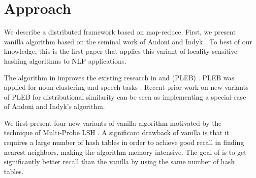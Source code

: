 \section{Approach}
\label{sec:approach}
We describe a distributed \lshf framework based on map-reduce. 
First, we present vanilla \lsh algorithm based on the seminal work of Andoni and Indyk  . 
To best of our knowledge, this is the first paper that applies this variant of locality sensitive hashing algorithms to NLP applications. 

The algorithm in \cite{Andoni08CACM} improves the existing research in \lsh and \plebf (PLEB) \cite{Indyk98STOC,Charikar02STOC}. 
PLEB was applied for noun clustering \cite{ravichandran05} and speech tasks \cite {JansenASRU11,JansenIS12}. 
Recent prior work on new variants of PLEB \cite{goyal12Flag} for distributional similarity can be seen as 
implementing a special case of Andoni and Indyk's \lsh algorithm. 

We first present four new variants of vanilla \lsh algorithm motivated by the technique of Multi-Probe LSH \cite{LvVLDB07}. 
A significant drawback of vanilla \lsh is that it requires a large number of hash tables in order to achieve good recall 
in finding nearest neighbors, making the algorithm memory intensive. The goal of  \mblshf 
is to get significantly better recall than the vanilla \lsh by using the same number of hash tables.


